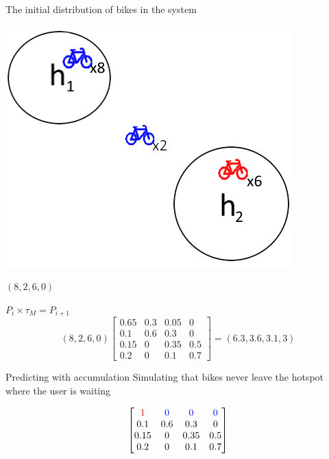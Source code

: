 \begin{frame}{}
	
\begin{center}
The initial distribution of bikes in the system

\includegraphics[scale=0.7]{graphics/initialworld}
	
$ (8,2,6,0) $
\end{center}
\end{frame}

\begin{frame}
	
\begin{center}	
	
$ P_i \times \tau_M = P_{i+1}$\\
		
		
$$
(8, 2, 6, 0)
\begin{bmatrix}
0.65 & 0.3 & 0.05 & 0\\
0.1  & 0.6 & 0.3  & 0\\
0.15 & 0   & 0.35 & 0.5\\
0.2  & 0   & 0.1  & 0.7
\end{bmatrix}
=
(6.3, 3.6, 3.1, 3)
$$
\end{center}
\end{frame}

\begin{frame}{Predicting with accumulation}
Simulating that bikes never leave the hotspot where the user is waiting

$$ \begin{bmatrix}
	{\color{red}1} & {\color{blue}0} & \color{blue} 0& {\color{blue}0}\\
	0.1  & 0.6 & 0.3  & 0\\
	0.15 & 0   & 0.35 & 0.5\\
	0.2  & 0   & 0.1  & 0.7
\end{bmatrix}
 $$
\end{frame}


